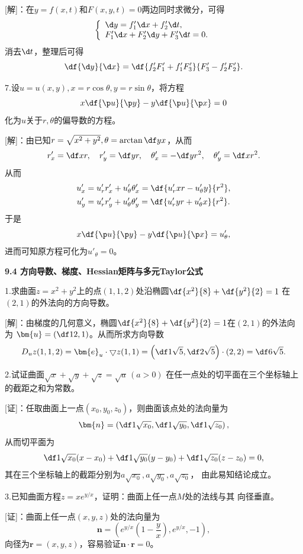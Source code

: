 [解]：在$y=f(x,t)$和$F(x,y,t)=0$两边同时求微分，可得
$$
	\left\{\begin{array}{l}
		\d y=f'_1\d x+f'_2\d t,\\
		F'_1\d x+F'_2\d y+F'_3\d t=0.
	\end{array}\right.
$$
消去$\d t$，整理后可得
$$\df{\d y}{\d x}=\df{f'_2F'_1+f'_1F'_3}{F'_3-f'_2F'_2}.$$
\fin

7.设$u=u(x,y),x=r\cos\theta,y=r\sin\theta$，将方程
$$x\df{\p u}{\p y}-y\df{\p u}{\p x}=0$$
化为$u$关于$r,\theta$的偏导数的方程。

[解]：由已知$r=\sqrt{x^2+y^2},\theta=\arctan\df yx$，从而
$$
	r'_x=\df xr,\quad r'_y= \df yr,\quad
	\theta'_x=-\df y{r^2},\quad \theta'_y=\df x{r^2}. 
$$
从而
\begin{align*}
	u'_x&=u'_rr'_x+u'_{\theta}\theta'_x=\df{u'_rxr-u'_{\theta}y}{r^2},\\
	u'_y&=u'_rr'_y+u'_{\theta}\theta'_y=\df{u'_ryr+u'_{\theta}x}{r^2}.
\end{align*}
于是
$$x\df{\p u}{\p y}-y\df{\p u}{\p x}=u'_{\theta},$$
进而可知原方程可化为$u'_{\theta}=0$。\fin

\bs

\begin{center}
	\bf 9.4 方向导数、梯度、Hessian矩阵与多元Taylor公式
\end{center}

1.求曲面$z=x^2+y^2$上的点$(1,1,2)$处沿椭圆$\df{x^2}{8}+\df{y^2}{2}=1$
在$(2,1)$的外法向的方向导数。

[解]：由梯度的几何意义，椭圆$\df{x^2}{8}+\df{y^2}{2}=1$在$(2,1)$的外法向为
$\bm{u}=\left(\df12,1\right)$。从而所求方向导数
$$D_uz(1,1,2)=\bm{e}_u\cdot\bigtriangledown z(1,1)
=\left(\df1{\sqrt5},\df2{\sqrt5}\right)\cdot (2,2)=\df6{\sqrt5}.$$
\fin

\bs

2.试证曲面$\sqrt{x}+\sqrt y+\sqrt z=\sqrt a\,(a>0)$
在任一点处的切平面在三个坐标轴上的截距之和为常数。

[证]：任取曲面上一点$(x_0,y_0,z_0)$，则曲面该点处的法向量为
$$\bm{n}=\left(\df1{\sqrt{x_0}},\df1{\sqrt{y_0}},
\df1{\sqrt{z_0}}\right),$$
从而切平面为
$$\df1{\sqrt{x_0}}(x-x_0)+\df1{\sqrt{y_0}}(y-y_0)
+\df1{\sqrt{z_0}}(z-z_0)=0,$$
其在三个坐标轴上的截距分别为$a\sqrt{x_0},a\sqrt{y_0},a\sqrt{z_0}$，
由此易知结论成立。\fin

\bs

3.已知曲面方程$z=xe^{y/x}$，证明：曲面上任一点$M$处的法线与其
向径垂直。

[证]：曲面上任一点$(x,y,z)$处的法向量为
$$\bm{n}=\left(e^{y/x}\left(1-\frac yx\right),e^{y/x},-1\right),$$
向径为$\bm{r}=(x,y,z)$，容易验证$\bm{n}\cdot\bm{r}=0$。\fin

